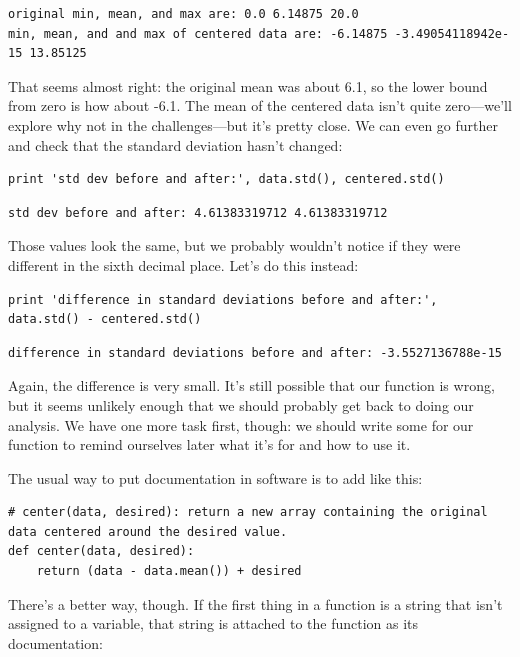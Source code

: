 \documentclass{book}
\begin{document}
\begin{verbatim}
original min, mean, and max are: 0.0 6.14875 20.0
min, mean, and and max of centered data are: -6.14875 -3.49054118942e-15 13.85125
\end{verbatim}

That seems almost right: the original mean was about 6.1, so the lower
bound from zero is how about -6.1. The mean of the centered data isn't
quite zero---we'll explore why not in the challenges---but it's pretty
close. We can even go further and check that the standard deviation
hasn't changed:

\begin{verbatim}
print 'std dev before and after:', data.std(), centered.std()
\end{verbatim}

\begin{verbatim}
std dev before and after: 4.61383319712 4.61383319712
\end{verbatim}

Those values look the same, but we probably wouldn't notice if they were
different in the sixth decimal place. Let's do this instead:

\begin{verbatim}
print 'difference in standard deviations before and after:', data.std() - centered.std()
\end{verbatim}

\begin{verbatim}
difference in standard deviations before and after: -3.5527136788e-15
\end{verbatim}

Again, the difference is very small. It's still possible that our
function is wrong, but it seems unlikely enough that we should probably
get back to doing our analysis. We have one more task first, though: we
should write some  for our
function to remind ourselves later what it's for and how to use it.

The usual way to put documentation in software is to add
 like this:

\begin{verbatim}
# center(data, desired): return a new array containing the original data centered around the desired value.
def center(data, desired):
    return (data - data.mean()) + desired
\end{verbatim}

There's a better way, though. If the first thing in a function is a
string that isn't assigned to a variable, that string is attached to the
function as its documentation:
\end{document}
